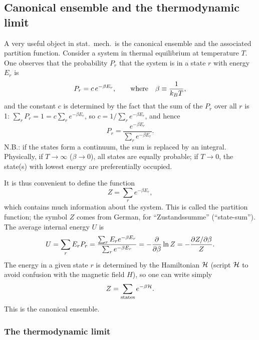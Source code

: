 \subsection{Canonical ensemble and the thermodynamic limit}

A very useful object in stat.\ mech.\ is the canonical ensemble and the associated
partition function. Consider a system in thermal equilibrium at temperature $T$. One
observes that the probability $P_r$ that the system is in a state $r$ with energy $E_r$ is
\begin{equation}
  P_r = c\,e^{-\beta E_r},\qquad\text{where}\quad \beta\equiv\frac{1}{k_{B} T},
\end{equation}
and the constant $c$ is determined by the fact that the sum of the $P_r$ over all $r$ is 1:
$\sum_r P_r = 1 = c\sum_r e^{-\beta E_r}$, so $c = 1/\sum_r e^{-\beta E_r}$, and hence
\begin{equation}
  P_r = \frac{e^{-\beta E_r}}{\sum_r e^{-\beta E_r}}.
\end{equation}
N.B.: if the states form a continuum, the sum is replaced by an integral. Physically, if
$T\to\infty$ ($\beta\to 0$), all states are equally probable; if $T\to 0$, the state(s)
with lowest energy are preferentially occupied.

It is thus convenient to define the function
\begin{equation}
  Z = \sum_r e^{-\beta E_r},
\end{equation}
which contains much information about the system. This is called the partition function;
the symbol $Z$ comes from German, for ``Zustandssumme'' (``state-sum''). The average
internal energy $U$ is
\begin{equation}
  U = \sum_r E_rP_r = \frac{\sum_r E_r e^{-\beta E_r}}{\sum_r e^{-\beta E_r}}
    = -\frac{\partial }{\partial \beta}\ln Z = -\frac{\partial Z/\partial\beta}{Z}.
\end{equation}
The energy in a given state $r$ is determined by the Hamiltonian $\mathcal{H}$ (script $\mathcal{H}$ to
avoid confusion with the magnetic field $H$), so one can write simply
\begin{equation}
  Z = \sum_{\text{states}}e^{-\beta\mathcal{H}}.
\end{equation}
This is the canonical ensemble.

\subsubsection*{The thermodynamic limit}

